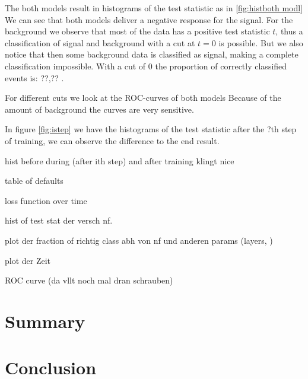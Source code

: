 \documentclass[%
 reprint,
 amsmath,amssymb,
 aps,
]{revtex4-2}
\begin{document}
The both models result in histograms of the test statistic as in \ref{fig:histboth modl}
We can see that both models deliver a negative response for the signal. For the background we observe that most of the data has a positive test statistic $t$, thus a classification of signal and background with a cut at $t=0$ is possible. But we also notice that then some background data is classified as signal, making a complete classification impossible. With a cut of 0 the proportion of correctly classified events is: ??,??
. 

For different cuts we look at the ROC-curves of both models
Because of the amount of background the curves are very sensitive.

In figure \ref{fig:istep} we have the histograms of the test statistic after the ?th step of training, we can observe the difference to the end result. 

hist before during (after ith step) and after training klingt nice

table of defaults

loss function over time

hist of test stat der versch nf. 

plot der fraction of richtig class
abh von nf und anderen params (layers, )

plot der Zeit

ROC curve (da vllt noch mal dran schrauben)


\section{Summary}

\section{Conclusion}
\end{document}
